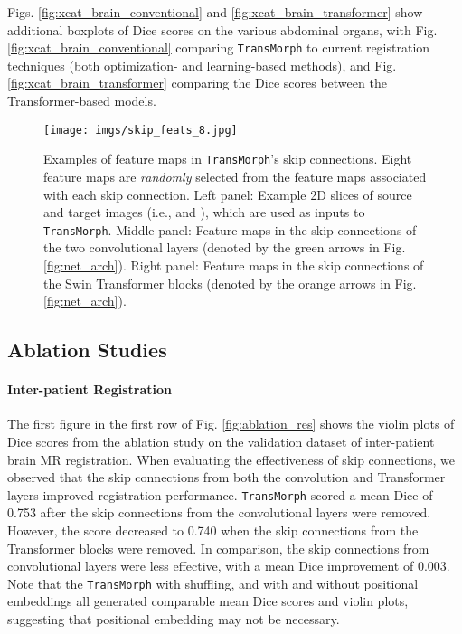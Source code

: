 \documentclass[times,twocolumn,final]{elsarticle}
\begin{document}
Figs. \ref{fig:xcat_brain_conventional} and \ref{fig:xcat_brain_transformer} show additional boxplots of Dice scores on the various abdominal organs, with Fig. \ref{fig:xcat_brain_conventional} comparing \texttt{TransMorph} to current registration techniques (both optimization- and learning-based methods), and Fig. \ref{fig:xcat_brain_transformer} comparing the Dice scores between the Transformer-based models.
\begin{figure*}[!t]
\centering
\texttt{[image: imgs/skip\_feats\_8.jpg]}
\caption{Examples of feature maps in \texttt{TransMorph}'s skip connections. Eight feature maps are \textit{randomly} selected from the feature maps associated with each skip connection. Left panel: Example 2D slices of source and target images (i.e.,  and ), which are used as inputs to \texttt{TransMorph}. Middle panel: Feature maps in the skip connections of the two convolutional layers (denoted by the green arrows in Fig. \ref{fig:net_arch}). Right panel: Feature maps in the skip connections of the Swin Transformer blocks (denoted by the orange arrows in Fig. \ref{fig:net_arch}). \label{fig:skip_feats_8}}
\end{figure*}

\subsection{Ablation Studies}
\label{sec:ablation_res}
\paragraph{Inter-patient Registration} The first figure in the first row of Fig. \ref{fig:ablation_res} shows the violin plots of Dice scores from the ablation study on the validation dataset of inter-patient brain MR registration. When evaluating the effectiveness of skip connections, we observed that the skip connections from both the convolution and Transformer layers improved registration performance. \texttt{TransMorph} scored a mean Dice of 0.753 after the skip connections from the convolutional layers were removed. However, the score decreased to 0.740 when the skip connections from the Transformer blocks were removed. In comparison, the skip connections from convolutional layers were less effective, with a mean Dice improvement of 0.003. Note that the \texttt{TransMorph} with shuffling, and with and without positional embeddings all generated comparable mean Dice scores and violin plots, suggesting that positional embedding may not be necessary.
\end{document}
